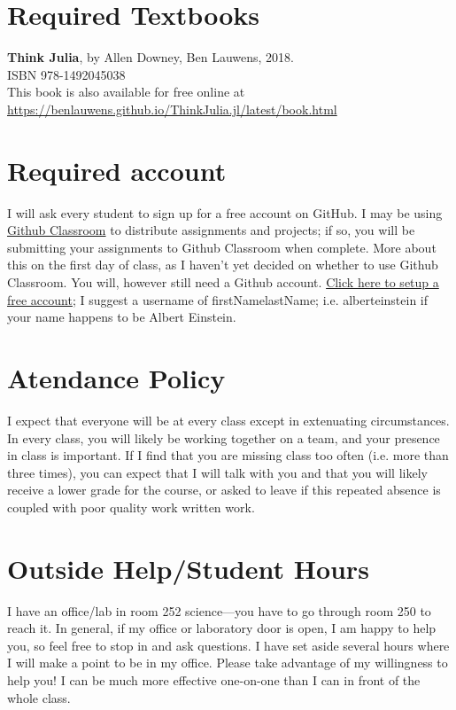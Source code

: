 \documentclass[justified]{tufte-handout}
\begin{document}
\section{Required Textbooks}

\textbf{Think Julia}, by Allen Downey, Ben Lauwens, 2018.\\
ISBN 978-1492045038\\
This book is also available for free online at\\
 \href{https://benlauwens.github.io/ThinkJulia.jl/latest/book.html}{https://benlauwens.github.io/ThinkJulia.jl/latest/book.html}
 
\section{Required account}
I will ask every student to sign up for a free account on GitHub. I may be using 
\href{http://classroom.github.com}{Github Classroom} to distribute assignments and projects; if so, you will be submitting your assignments to Github Classroom when complete. More about this on the first day of class, as I haven't yet decided on whether to use Github Classroom. You will, however still need a Github account. \href{https://github.com/join}{Click here to setup a free account}; I suggest a username of firstNamelastName; i.e. alberteinstein if your name happens to be Albert Einstein. 

\section{Atendance Policy}
I expect that everyone will be at every class except in extenuating circumstances. 
In every class, you will likely be working together on a team, and your presence in class
is important. If I find that you are missing class too often (i.e. more than three times), 
you can expect that I will talk with you and that you will likely receive a 
lower grade for the course, or asked to leave if this repeated absence is coupled 
with poor quality work written work. 

\pagebreak

\section{Outside Help/Student Hours}
I have an office/lab in room 252 science---you have to go through room 250 to reach it. 
In general, if my office or laboratory door is open, I am happy to help you, so feel free to stop in
and ask questions. I have set aside several hours
where I will make a point to be in my office. Please take advantage of my
willingness to help you! I can be much more effective one-on-one than I can in
front of the whole class. 
\end{document}
